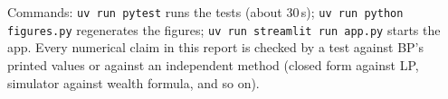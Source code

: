 \documentclass[11pt,a4paper]{article}
\begin{document}
\noindent Commands: \texttt{uv run pytest} runs the tests (about 30\,s);
\texttt{uv run python figures.py} regenerates the figures; \texttt{uv run streamlit run
app.py} starts the app. Every numerical claim in this report is checked by a test against
BP's printed values or against an independent method (closed form against LP, simulator
against wealth formula, and so on).
\end{document}
